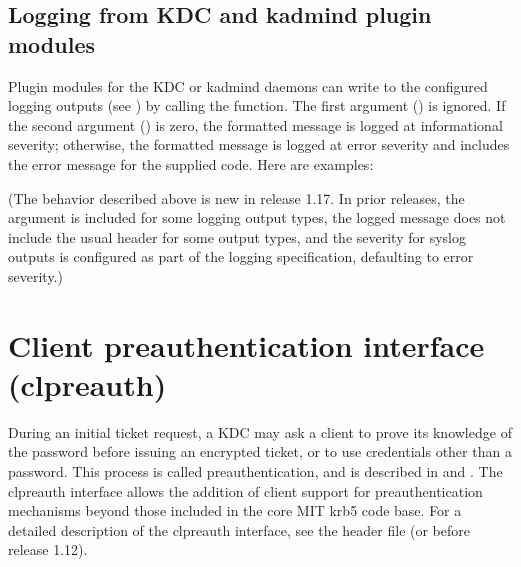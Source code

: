 \documentclass[letterpaper,10pt,english]{sphinxmanual}
\begin{document}
\subsection{Logging from KDC and kadmind plugin modules}
\label{\detokenize{plugindev/general:logging-from-kdc-and-kadmind-plugin-modules}}
\sphinxAtStartPar
Plugin modules for the KDC or kadmind daemons can write to the
configured logging outputs (see ) by calling the
 function.  The first argument () is ignored.  If
the second argument () is zero, the formatted message is logged
at informational severity; otherwise, the formatted message is logged
at error severity and includes the error message for the supplied
code.  Here are examples:

\begin{sphinxVerbatim}[commandchars=\\\{\}]
   
  
\end{sphinxVerbatim}

\sphinxAtStartPar
(The behavior described above is new in release 1.17.  In prior
releases, the  argument is included for some logging output
types, the logged message does not include the usual header for some
output types, and the severity for syslog outputs is configured as
part of the logging specification, defaulting to error severity.)


\section{Client preauthentication interface (clpreauth)}
\label{\detokenize{plugindev/clpreauth:client-preauthentication-interface-clpreauth}}\label{\detokenize{plugindev/clpreauth::doc}}
\sphinxAtStartPar
During an initial ticket request, a KDC may ask a client to prove its
knowledge of the password before issuing an encrypted ticket, or to
use credentials other than a password.  This process is called
preauthentication, and is described in  and .
The clpreauth interface allows the addition of client support for
preauthentication mechanisms beyond those included in the core MIT
krb5 code base.  For a detailed description of the clpreauth
interface, see the header file  (or
 before release 1.12).
\end{document}
